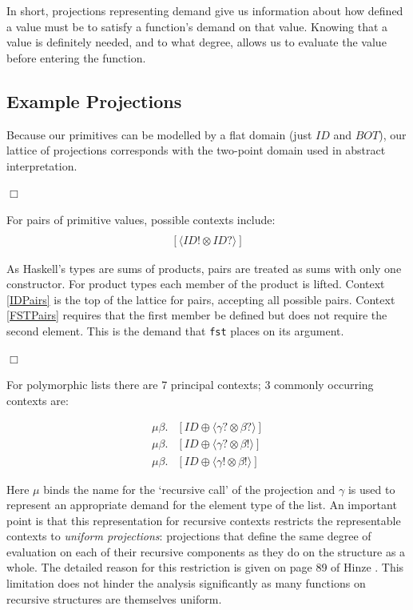 In short, projections representing demand give us information about how defined
a value must be to satisfy a function's demand on that value. Knowing that a
value is definitely needed, and to what degree, allows us to evaluate the value
before entering the function.

\subsection*{Example Projections}

Because our primitives can be modelled by a flat domain (just $ID$ and $BOT$),
our lattice of projections corresponds with the two-point domain used in
abstract interpretation.

\hfill$\Box$

For pairs of primitive values, possible contexts include:
\begin{align}
[\langle ID? \otimes ID? \rangle] \label{IDPairs} \\
[\langle ID! \otimes ID? \rangle] \label{FSTPairs}
\end{align}


As Haskell's types are sums of products, pairs are treated as sums with only
one constructor.  For product types each member of the product is lifted.
Context \ref{IDPairs} is the top of the lattice for pairs, accepting all
possible pairs. Context \ref{FSTPairs} requires that the first member be
defined but does not require the second element. This is the demand that
\verb-fst- places on its argument.

\hfill$\Box$

For polymorphic lists there are 7 principal contexts; 3 commonly occurring contexts are:

\begin{align}
    \mu\beta.&[ID \oplus \langle \gamma? \otimes \beta?\rangle] \label{IDList} \\
    \mu\beta.&[ID \oplus \langle \gamma? \otimes \beta!\rangle] \label{FINList} \\
    \mu\beta.&[ID \oplus \langle \gamma! \otimes \beta!\rangle] \label{FULLList}
\end{align}


Here $\mu$ binds the name for the `recursive call' of the projection and
$\gamma$ is used to represent an appropriate demand for the element type of the
list.  An important point is that this representation for recursive contexts
restricts the representable contexts to \emph{uniform projections}: projections
that define the same degree of evaluation on each of their recursive components
as they do on the structure as a whole. The detailed reason for this
restriction is given on page 89 of Hinze \citep{hinze1995projection}. This
limitation does not hinder the analysis significantly as many functions on
recursive structures are themselves uniform.

